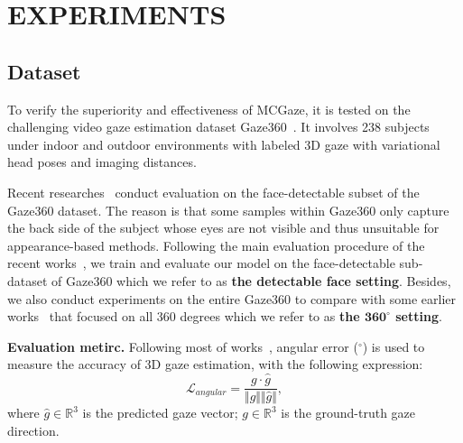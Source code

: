 \documentclass[journal]{IEEEtran}
\begin{document}
\section{EXPERIMENTS}
\subsection{Dataset}
To verify the superiority and effectiveness of MCGaze, it is tested on the challenging video gaze estimation dataset Gaze360~\cite{kellnhofer2019gaze360}. It involves 238 subjects under indoor and outdoor environments with labeled 3D gaze with variational head poses and imaging distances.


Recent researches~\cite{cheng2022gaze,abdelrahman2022l2cs,yan2023gaze} conduct evaluation on the face-detectable subset of the Gaze360 dataset. The reason is that some samples within Gaze360 only capture the back side of the subject whose eyes are not visible and thus unsuitable for appearance-based methods. Following the main evaluation procedure of the recent works~\cite{cheng2022gaze,abdelrahman2022l2cs,yan2023gaze}, we train and evaluate our model on the face-detectable sub-dataset of Gaze360 which we refer to as \textbf{the detectable face setting}.
Besides, we also conduct experiments on the entire Gaze360 to compare with some earlier works~\cite{kellnhofer2019gaze360,kothari2021weakly} that focused on all 360 degrees which we refer to as \textbf{the $\boldsymbol{360^\circ}$ setting}.


\textbf{Evaluation metirc.} Following most of works~\cite{kellnhofer2019gaze360,cheng2022gaze,abdelrahman2022l2cs,yan2023gaze, 2eye_gaze}, angular error ($^\circ$) is used to measure the accuracy of 3D gaze estimation, with the following expression: 
\begin{equation}
\mathcal{L}_{angular}={\frac{g \cdot \hat{g}}{\Vert g \Vert \Vert \hat{g} \Vert }},  
\end{equation}
where $\hat g\in\mathbb{R}^{3}$ is the predicted gaze vector; ${g}\in\mathbb{R}^{3}$ is the ground-truth gaze direction. 
\end{document}
